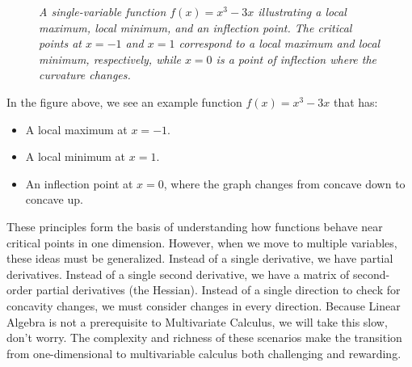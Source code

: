 \begin{figure}[H]
\centering
{}
\caption{\textit{A single-variable function \(f(x)=x^3-3x\) illustrating a local maximum, local minimum, and an inflection point. The critical points at \(x=-1\) and \(x=1\) correspond to a local maximum and local minimum, respectively, while \(x=0\) is a point of inflection where the curvature changes.}}
\end{figure}

\noindent In the figure above, we see an example function \( f(x)=x^3 - 3x \) that has:
\begin{itemize}
    \item A local maximum at \( x=-1 \).
    \item A local minimum at \( x=1 \).
    \item An inflection point at \( x=0 \), where the graph changes from concave down to concave up.
\end{itemize}


\noindent These principles form the basis of understanding how functions behave near critical points in one dimension. However, when we move to multiple variables, these ideas must be generalized. Instead of a single derivative, we have partial derivatives. Instead of a single second derivative, we have a matrix of second-order partial derivatives (the Hessian). Instead of a single direction to check for concavity changes, we must consider changes in every direction. Because Linear Algebra is not a prerequisite to Multivariate Calculus, we will take this slow, don't worry. The complexity and richness of these scenarios make the transition from one-dimensional to multivariable calculus both challenging and rewarding. \\


